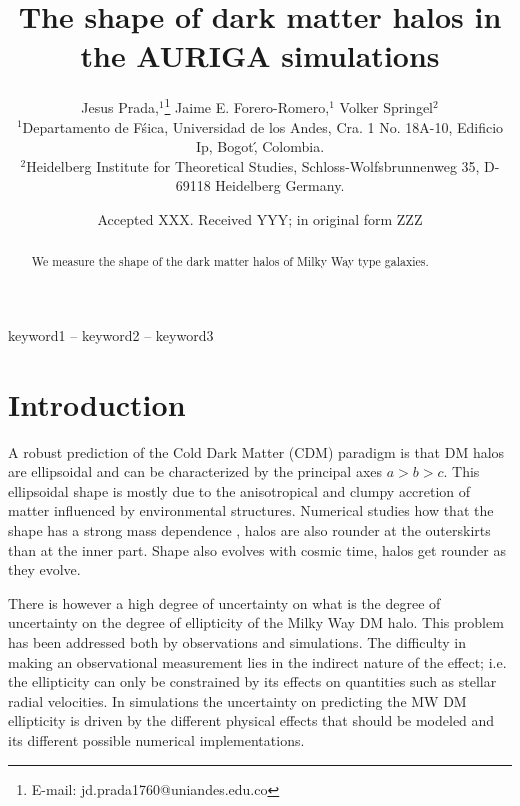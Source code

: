 \documentclass[a4paper,fleqn,usenatbib]{mnras}
\title[Dark Matter halo shape in the AURIGA simulations]{The shape of dark matter
  halos in the AURIGA simulations}
\author[Jesus Prada,  Jaime E. Forero-Romero, Volker Springel ]{
Jesus Prada,$^{1}$\thanks{E-mail: jd.prada1760@uniandes.edu.co}
Jaime E. Forero-Romero,$^{1}$
Volker Springel$^{2}$
\\
$^{1}$Departamento de F\'sica, Universidad de los Andes, Cra. 1 No.
18A-10, Edificio Ip, Bogot\', Colombia.\\
$^{2}$Heidelberg Institute for Theoretical Studies, Schloss-Wolfsbrunnenweg 35, D-69118 Heidelberg
Germany.\\
}
\date{Accepted XXX. Received YYY; in original form ZZZ}
\begin{document}
\label{firstpage}
\pagerange{\pageref{firstpage}--\pageref{lastpage}}
\maketitle

\begin{abstract}
We measure the shape of the dark matter halos of Milky Way type galaxies.
\end{abstract}

\begin{keywords}
keyword1 -- keyword2 -- keyword3
\end{keywords}



\section{Introduction}


A robust prediction of the Cold Dark Matter (CDM) paradigm is that DM
halos are ellipsoidal and can be characterized by the principal axes
$a>b>c$.
This ellipsoidal shape is mostly due to the anisotropical and
clumpy accretion of matter influenced by environmental structures.
Numerical studies how that the shape has a strong mass dependence
\citep{Allgood_et_al._2006}, halos are also rounder at the outerskirts
than at the inner part. 
Shape also evolves with cosmic time, halos get
rounder as they evolve.  

There is however a high degree of uncertainty on what is the degree of
uncertainty on the degree of ellipticity of the Milky Way DM halo.
This problem has been addressed both by observations and simulations.
The difficulty in making an observational measurement lies in the
indirect nature of the effect; i.e. the ellipticity can only be
constrained by its effects on quantities such as stellar radial
velocities.
In simulations the uncertainty on predicting the MW DM ellipticity is 
driven by the different physical effects that should be modeled and
its different possible numerical implementations.
\end{document}
